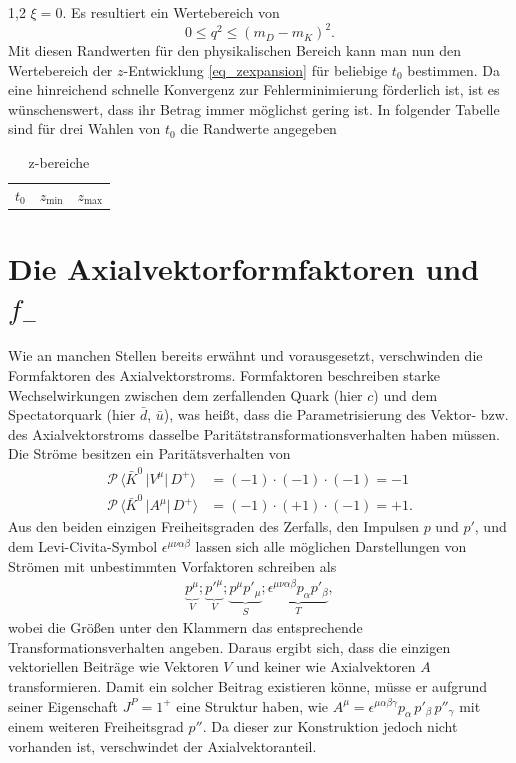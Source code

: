 \documentclass[11pt,a4paper,twoside,draft]{report}
\begin{document}
\begin{spacing}{1,2}
$\xi = 0$. Es resultiert ein Wertebereich von
\begin{equation}
 0 \leq q^2 \leq (m_D - m_K)^2.
\end{equation}
Mit diesen Randwerten für den physikalischen Bereich kann man nun den Wertebereich der $z$-Entwicklung \eqref{eq_zexpansion} für beliebige $t_0$ bestimmen.
Da eine hinreichend schnelle Konvergenz zur Fehlerminimierung förderlich ist, ist es wünschenswert, dass ihr Betrag immer möglichst gering ist. In 
folgender Tabelle sind für drei Wahlen von $t_0$ die Randwerte angegeben
\begin{table}[h]
 \begin{tabular}{c|cc}
  $t_0$ & $z_\text{min}$ & $z_\text{max}$\\
 \end{tabular}
\caption{z-bereiche}
\label{tab_zbereich}
\end{table}


\section{Die Axialvektorformfaktoren und $f_-$}
Wie an manchen Stellen bereits erwähnt und vorausgesetzt, verschwinden die Formfaktoren des Axialvektorstroms. Formfaktoren beschreiben starke 
Wechselwirkungen zwischen dem zerfallenden Quark (hier $c$) und dem Spectatorquark (hier $\bar d$, $\bar u$), was heißt, dass die Parametrisierung des 
Vektor- bzw. des Axialvektorstroms dasselbe Paritätstransformationsverhalten haben müssen. Die Ströme besitzen ein Paritätsverhalten von
\begin{align}
 \mathcal{P} \, \big\langle\bar K^0\,\big|V^\mu|\,D^+\big\rangle &= (-1)\cdot(-1)\cdot(-1) = -1 \nonumber \\
 \mathcal{P} \, \big\langle\bar K^0\,\big|A^\mu|\,D^+\big\rangle &= (-1)\cdot(+1)\cdot(-1) = +1. \nonumber
\end{align}
Aus den beiden einzigen Freiheitsgraden des Zerfalls, den Impulsen $p$ und $p'$, und dem Levi-Civita-Symbol $\epsilon^{\mu\nu\alpha\beta}$ lassen sich alle möglichen
Darstellungen von Strömen mit unbestimmten Vorfaktoren schreiben als
\begin{align}
 \underbrace{p^\mu}_{V} ; \underbrace{p'^\mu}_{V}; \underbrace{p^\mu p'_\mu }_{S} ; \underbrace{\epsilon^{\mu\nu\alpha\beta}p_\alpha p'_\beta}_{T},
\end{align}
wobei die Größen unter den Klammern das entsprechende Transformationsverhalten angeben. Daraus ergibt sich, dass die einzigen vektoriellen Beiträge wie 
Vektoren $V$ und keiner wie Axialvektoren $A$ transformieren. Damit ein solcher Beitrag existieren könne, müsse er aufgrund seiner Eigenschaft $J^P = 1^+$
eine Struktur haben, wie $A^\mu = \epsilon^{\mu\alpha\beta\gamma}p_\alpha\,p'_\beta\,p''_\gamma$ mit einem weiteren Freiheitsgrad $p''$. Da dieser zur 
Konstruktion jedoch nicht vorhanden ist, verschwindet der Axialvektoranteil.


\end{spacing}
\end{document}
